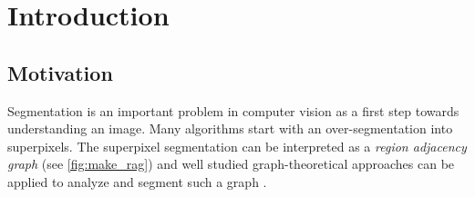 \chapter{Introduction}\label{main_introduction}


\section{Motivation}
Segmentation is an important problem in computer vision as a first step
towards understanding an image. Many algorithms start with an over-segmentation
into superpixels.
The superpixel segmentation can be interpreted as a \emph{region adjacency graph} (see \cref{fig:make_rag}) and
well studied graph-theoretical approaches can be applied to analyze and segment such a graph \cite{vlachos_1993_csv}.










